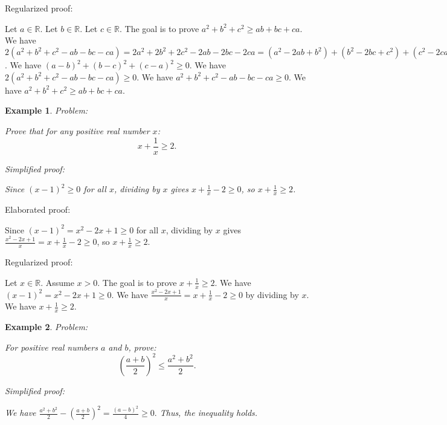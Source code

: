 \documentclass{article}
\newtheorem{example}{Example}
\begin{document}
Regularized proof:
\begin{tcolorbox}[colback=red!10, width=\linewidth]
Let $a\in\mathbb{R}$.
Let $b\in\mathbb{R}$.
Let $c\in\mathbb{R}$.
The goal is to prove $a^2 + b^2 + c^2 \geq ab + bc + ca$.
We have $2(a^2 + b^2 + c^2 - ab - bc - ca) = 2a^2 + 2b^2 + 2c^2 - 2ab - 2bc - 2ca = (a^2 - 2ab + b^2) + (b^2 - 2bc + c^2) + (c^2 - 2ca + a^2) = {(a-b)}^2 + {(b-c)}^2 + {(c-a)}^2$.
We have ${(a-b)}^2 + {(b-c)}^2 + {(c-a)}^2 \ge 0$.
We have $2(a^2 + b^2 + c^2 - ab - bc - ca) \ge 0$.
We have $a^2 + b^2 + c^2 - ab - bc - ca \ge 0$.
We have $a^2 + b^2 + c^2 \geq ab + bc + ca$.
\end{tcolorbox}


\begin{example}
Problem:
\begin{tcolorbox}[colback=yellow!10, width=\linewidth]
Prove that for any positive real number $x$:
    $$x + \frac{1}{x} \geq 2.$$
\end{tcolorbox}

Simplified proof:
\begin{tcolorbox}[colback=blue!10, width=\linewidth]
Since $(x-1)^2 \ge 0$ for all $x$, dividing by $x$ gives $x + \frac{1}{x} - 2 \ge 0$, so $x + \frac{1}{x} \ge 2$.
\end{tcolorbox}
\end{example}

Elaborated proof:
\begin{tcolorbox}[colback=green!10, width=\linewidth]
Since $(x-1)^2 = x^2 - 2x + 1 \ge 0$ for all $x$, dividing by $x$ gives $\frac{x^2 - 2x + 1}{x} = x + \frac{1}{x} - 2 \ge 0$, so $x + \frac{1}{x} \ge 2$.
\end{tcolorbox}

Regularized proof:
\begin{tcolorbox}[colback=red!10, width=\linewidth]
Let $x\in\mathbb{R}$. Assume $x>0$.
The goal is to prove $x + \frac{1}{x} \ge 2$.
We have ${\left(x-1\right)}^2 = x^2 - 2x + 1 \ge 0$.
We have $\frac{x^2 - 2x + 1}{x} = x + \frac{1}{x} - 2 \ge 0$ by dividing by $x$.
We have $x + \frac{1}{x} \ge 2$.
\end{tcolorbox}


\begin{example}
Problem:
\begin{tcolorbox}[colback=yellow!10, width=\linewidth]
For positive real numbers $a$ and $b$, prove:
    $$\left(\frac{a+b}{2}\right)^2 \leq \frac{a^2+b^2}{2}.$$
\end{tcolorbox}

Simplified proof:
\begin{tcolorbox}[colback=blue!10, width=\linewidth]
We have
$ \frac{a^2+b^2}{2} - \left(\frac{a+b}{2}\right)^2 = \frac{(a-b)^2}{4} \ge 0. $
Thus, the inequality holds.
\end{tcolorbox}
\end{example}
\end{document}

